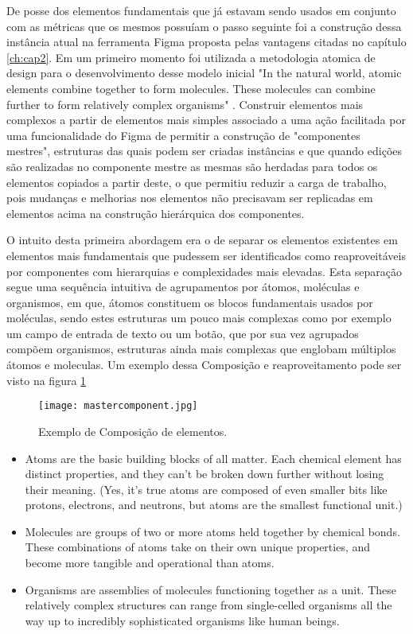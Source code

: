   De posse dos elementos fundamentais que já estavam sendo usados em conjunto com as métricas que os mesmos possuíam o passo seguinte foi a construção dessa instância atual na ferramenta Figma proposta pelas vantagens citadas no capítulo \ref{ch:cap2}. Em um primeiro momento foi utilizada a metodologia atomica de design para o desenvolvimento desse modelo inicial "In the natural world, atomic elements combine together to form molecules. These molecules can combine further to form relatively complex organisms" \cite{atomic_design}. Construir elementos mais complexos a partir de elementos mais simples associado a uma ação facilitada por uma funcionalidade do Figma de permitir a construção de "componentes mestres", estruturas das quais podem ser criadas instâncias e que quando edições são realizadas no componente mestre as mesmas são herdadas para todos os elementos copiados a partir deste, o que permitiu reduzir a carga de trabalho, pois mudanças e melhorias nos elementos não precisavam ser replicadas em elementos acima na construção hierárquica dos componentes.

  O intuito desta primeira abordagem era o de separar os elementos existentes em elementos mais fundamentais que pudessem ser identificados como reaproveitáveis por componentes com hierarquias e complexidades mais elevadas. Esta separação segue uma sequência intuitiva de agrupamentos por átomos, moléculas e organismos, em que, átomos constituem os blocos fundamentais usados por moléculas, sendo estes estruturas um pouco mais complexas como por exemplo um campo de entrada de texto ou um botão, que por sua vez agrupados compõem organismos, estruturas ainda mais complexas que englobam múltiplos átomos e moleculas. Um exemplo dessa Composição e reaproveitamento pode ser visto na figura \ref{fig:mastercomponent}

  \begin{figure}[h!]
    \texttt{[image: mastercomponent.jpg]}
    \caption{Exemplo de Composição de elementos.}
    \label{fig:mastercomponent}
  \end{figure}

  \begin{citacao}[brazil]
    \begin{itemize}
      \item Atoms are the basic building blocks of all matter. Each chemical element has distinct properties, and they can’t be broken down further without losing their meaning. (Yes, it’s true atoms are composed of even smaller bits like protons, electrons, and neutrons, but atoms are the smallest functional unit.)
      \item Molecules are groups of two or more atoms held together by chemical bonds. These combinations of atoms take on their own unique properties, and become more tangible and operational than atoms.
      \item Organisms are assemblies of molecules functioning together as a unit. These relatively complex structures can range from single-celled organisms all the way up to incredibly sophisticated organisms like human beings.
    \end{itemize}
    \cite{atomic_design}
    \end{citacao}

